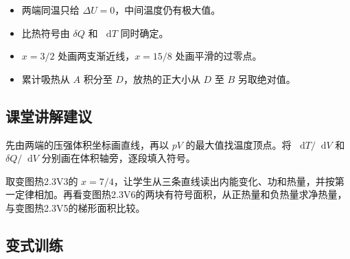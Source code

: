 \documentclass[UTF8,fontset=fandol,a4paper,11pt]{ctexart}
\newcommand{\dd}{\mathop{}\!\mathrm{d}}
\begin{document}
\begin{itemize}
\item 两端同温只给 $\Delta U=0$，中间温度仍有极大值。
\item 比热符号由 $\delta Q$ 和 $\dd T$ 同时确定。
\item $x=3/2$ 处画两支渐近线，$x=15/8$ 处画平滑的过零点。
\item 累计吸热从 $A$ 积分至 $D$，放热的正大小从 $D$ 至 $B$ 另取绝对值。
\end{itemize}



\subsection*{课堂讲解建议}

先由两端的压强体积坐标画直线，再以 $pV$ 的最大值找温度顶点。将 $\dd T/\dd V$ 和 $\delta Q/\dd V$ 分别画在体积轴旁，逐段填入符号。

取变图热2.3V3的 $x=7/4$，让学生从三条直线读出内能变化、功和热量，并按第一定律相加。再看变图热2.3V6的两块有符号面积，从正热量和负热量求净热量，与变图热2.3V5的梯形面积比较。



\subsection*{变式训练}
\end{document}
